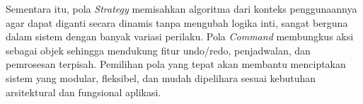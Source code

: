 Sementara itu, pola \textit{Strategy} memisahkan algoritma dari konteks penggunaannya agar dapat diganti secara dinamis tanpa mengubah logika inti, sangat berguna dalam sistem dengan banyak variasi perilaku. Pola \textit{Command} membungkus aksi sebagai objek sehingga mendukung fitur undo/redo, penjadwalan, dan pemrosesan terpisah. Pemilihan pola yang tepat akan membantu menciptakan sistem yang modular, fleksibel, dan mudah dipelihara sesuai kebutuhan arsitektural dan fungsional aplikasi.
